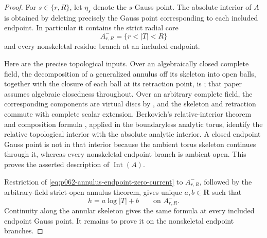 
\begin{proof}
For \(s\in\{r,R\}\), let \(\eta_s\) denote the \(s\)-Gauss point.
The absolute interior of \(A\) is obtained by deleting precisely the Gauss
point corresponding to each included endpoint.  In particular it contains
the strict radial core
\[
                         A^-_{r,R}=\{r<|T|<R\}
\]
and every nonskeletal residue branch at an included endpoint.

Here are the precise topological inputs.  Over an algebraically closed
complete field, the decomposition of a generalized annulus off its skeleton
into open balls, together with the closure of each ball at its retraction
point, is \cite[Lemma~2.12]{BPR13Structure}; that paper assumes algebraic
closedness throughout.  Over an arbitrary complete field, the corresponding
components are virtual discs by
\cite[\S\S3.6.35.5--3.6.35.10, especially 3.6.35.8]
{Ducros24CurveStructure}, and the skeleton and retraction commute with
complete scalar extension.  Berkovich's relative-interior theorem and
composition formula \cite[Proposition~1.5.5(i)--(ii)]{Berk93}, applied in the
boundaryless analytic torus, identify the relative topological interior with
the absolute analytic interior.  A closed endpoint Gauss point is not in that
interior because the ambient torus skeleton continues through it, whereas
every nonskeletal endpoint branch is ambient open.  This proves the asserted
description of \(\operatorname{Int}(A)\).

Restriction of \eqref{eq:p062-annulus-endpoint-zero-current} to
\(A^-_{r,R}\), followed by the arbitrary-field strict-open annulus theorem,
gives unique \(a,b\in\mathbf R\) such that
\begin{equation}\label{eq:p062-annulus-endpoint-core-formula}
                         h=a\log|T|+b
                         \qquad\text{on }A^-_{r,R}.
\end{equation}
Continuity along the annular skeleton gives the same formula at every
included endpoint Gauss point.  It remains to prove it on the nonskeletal
endpoint branches.


\end{proof}
